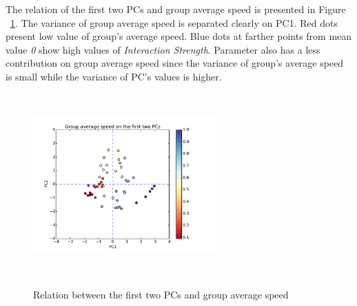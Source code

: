 \documentclass[a4paper,11pt,phdthesis,singlespace,twoside]{cssethesis}
\begin{document}
The relation of the first two PCs and group average speed is presented in Figure ~\ref{fig:pca_lanscape_group_speed}. The variance of group average speed is separated clearly on PC1. Red dots present low value of group's average speed. Blue dots at farther points from mean value \textit{0} show high values of \textit{Interaction Strength}. Parameter  also has a less contribution on group average speed since the variance of group's average speed is small while the variance of PC's values is higher. 
\begin{figure}[H]
\begin{center}
{\includegraphics[width=7cm,height=7cm]{figs/pca_lanscape_group_speed.pdf}}
\end{center}
\caption{Relation between the first two PCs and group average speed}
\label{fig:pca_lanscape_group_speed}
\end{figure}
\end{document}
